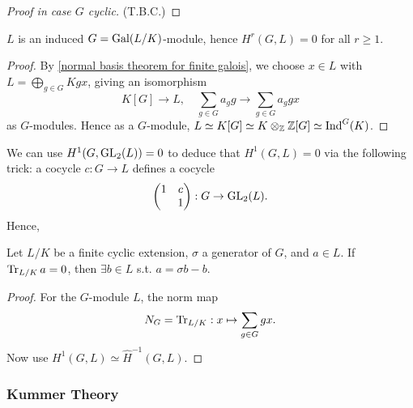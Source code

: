 \begin{proof}[Proof in case $G$ cyclic]
    (T.B.C.)
\end{proof}

\begin{proposition}
    $L$ is an induced $G = \operatorname{Gal}(L/K)$-module, hence
    $H^r(G, L) = 0$ for all $r \ge 1$.
\end{proposition}
\begin{proof}
    By \cref{normal basis theorem for finite galois},
    we choose $x\in L$ with $L = \bigoplus_{g\in G} Kgx$, giving an isomorphism \[K[G]\to L,\quad \sum_{g\in G}a_gg\to\sum_{g\in G}a_ggx\]
    as $G$-modules. Hence as a $G$-module,
    $L\simeq K[G]\simeq K\otimes_{\mathbb{Z}} \mathbb{Z}[G]\simeq\operatorname{Ind}^G(K)$.
\end{proof}
\begin{remark}
    We can use $H^1(G, \operatorname{GL}_2(L)) = 0$ to deduce that $H^1(G, L) = 0$ via the following trick:
    a cocycle $c : G\to L$ defines a cocycle \[\begin{pmatrix}
        1 & c \\ & 1
    \end{pmatrix} : G\to\operatorname{GL}_2(L).\]
    Hence, 
\end{remark}

\begin{corollary}\label{Hilbert 90 - additive}
    Let $L/K$ be a finite cyclic extension, $\sigma$ a generator of $G$, and $a\in L$.
    If $\operatorname{Tr}_{L/K}a = 0$,
    then $\exists b\in L$ s.t. $a = \sigma b - b$.
\end{corollary}
\begin{proof}
    For the $G$-module $L$, the norm map \[N_G = \operatorname{Tr}_{L/K} : x\mapsto \sum_{g\in G}gx.\]
    Now use $H^{1}(G, L) \simeq \hat H^{-1}(G, L)$.
\end{proof}

\subsubsection{Kummer Theory}
